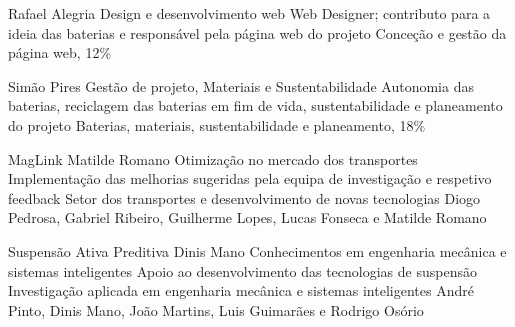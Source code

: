 {{Rafael Alegria}}
{{Design e desenvolvimento web}}
{{Web Designer; contributo para a ideia das baterias e responsável pela página web do projeto}}
{{Conceção e gestão da página web, 12\%}}

{{Simão Pires}}
{{Gestão de projeto, Materiais e Sustentabilidade}}
{{Autonomia das baterias, reciclagem das baterias em fim de vida, sustentabilidade e planeamento do projeto}}
{{Baterias, materiais, sustentabilidade e planeamento, 18\%}}

  {MagLink}
  {Matilde Romano}
  {Otimização no mercado dos transportes}
  {Implementação das melhorias sugeridas pela equipa de investigação e respetivo feedback}
  {Setor dos transportes e desenvolvimento de novas tecnologias}
  {Diogo Pedrosa, Gabriel Ribeiro, Guilherme Lopes, Lucas Fonseca e Matilde Romano}

  {Suspensão Ativa Preditiva}
  {Dinis Mano}
  {Conhecimentos em engenharia mecânica e sistemas inteligentes}
  {Apoio ao desenvolvimento das tecnologias de suspensão}
  {Investigação aplicada em engenharia mecânica e sistemas inteligentes}
  {André Pinto, Dinis Mano, João Martins, Luis Guimarães e Rodrigo Osório}
